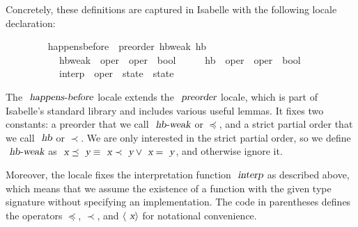 Concretely, these definitions are captured in Isabelle with the following locale declaration:
\vspace{0.375em}
\begin{isabellebody}
\ \ \ \ \ \ \ \  happens{\isacharunderscore}before\ {\isacharequal}\ preorder\ hb{\isacharunderscore}weak\ hb\isanewline
\ \ \ \ \ \ \ \ \ \ \ hb{\isacharunderscore}weak\ {\isacharcolon}{\isacharcolon}\ {\isachardoublequoteopen}{\isacharprime}oper\ {\isasymRightarrow}\ {\isacharprime}oper\ {\isasymRightarrow}\ bool{\isachardoublequoteclose}\ \ {\isacharparenleft}\ {\isachardoublequoteopen}{\isasympreceq}{\isachardoublequoteclose}\ {}{}{\isacharparenright}\ \ hb\ {\isacharcolon}{\isacharcolon}\ {\isachardoublequoteopen}{\isacharprime}oper\ {\isasymRightarrow}\ {\isacharprime}oper\ {\isasymRightarrow}\ bool{\isachardoublequoteclose}\ \ {\isacharparenleft}\ {\isachardoublequoteopen}{\isasymprec}{\isachardoublequoteclose}\ {}{}{\isacharparenright}\ {\isacharplus}\isanewline
\ \ \ \ \ \ \ \ \ \ \ interp\ {\isacharcolon}{\isacharcolon}\ {\isachardoublequoteopen}{\isacharprime}oper\ {\isasymRightarrow}\ {\isacharprime}state\ {\isasymrightharpoonup}\ {\isacharprime}state{\isachardoublequoteclose}\ {\isacharparenleft}{\isachardoublequoteopen}{\isasymlangle}{\isacharunderscore}{\isasymrangle}{\isachardoublequoteclose}\ {\isacharbrackleft}{}{\isacharbrackright}\ {}{}{}{}{\isacharparenright}
\end{isabellebody}
\vspace{0.375em}
The $\isa{happens-before}$ locale extends the $\isa{preorder}$ locale, which is part of Isabelle's standard library and includes various useful lemmas.
It fixes two constants: a preorder that we call $\isa{hb-weak}$ or $\preceq$, and a strict partial order that we call $\isa{hb}$ or $\prec$.
We are only interested in the strict partial order, so we define $\isa{hb-weak}$ as $\isa{x}\preceq\isa{y} \equiv \isa{x}\prec\isa{y} \vee \isa{x}=\isa{y}$, and otherwise ignore it.

Moreover, the locale fixes the interpretation function $\isa{interp}$ as described above, which means that we assume the existence of a function with the given type signature without specifying an implementation.
The code in parentheses defines the operators $\preceq$, $\prec$, and $\langle\isa{x}\rangle$ for notational convenience.

